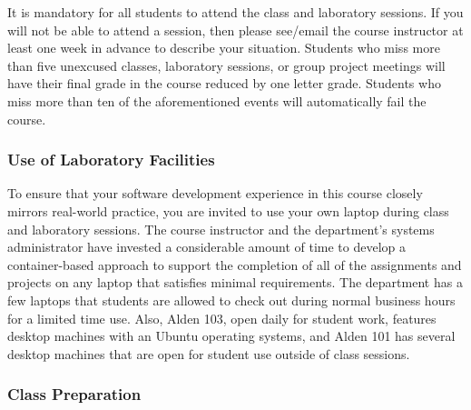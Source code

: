 \documentclass[11pt]{article} %
\begin{document}
It is mandatory for all students to attend the class and laboratory sessions. If you will not be able to attend a session, then please see/email the course instructor at least one week in advance to describe your situation.  Students who miss more than five unexcused classes, laboratory sessions, or group project meetings will have their final grade in the course reduced by one letter grade. Students who miss more than ten of the aforementioned events will automatically fail the course.

% 
% 

\subsubsection*{\textbf{Use of Laboratory Facilities}}


To ensure that your software development experience in this course closely mirrors real-world practice, you are invited to use your own laptop during class and laboratory sessions. The course instructor and the department's systems administrator have invested a considerable amount of time to develop a container-based approach to support the completion of all of the assignments and projects on any laptop that satisfies minimal requirements. The department has a few laptops that students are allowed to check out during normal business hours for a limited time use. Also, Alden 103, open daily for student work, features desktop machines with an Ubuntu operating systems, and Alden 101 has several desktop machines that are open for student use outside of class sessions.


\subsubsection*{\textbf{Class Preparation}}
\end{document}
